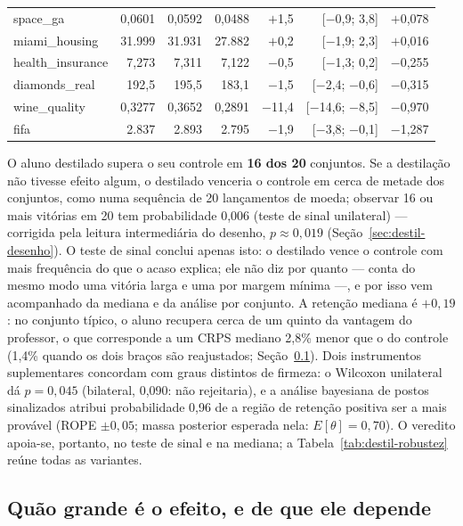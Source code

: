 \begin{table}[htbp]
\begin{tabular}{lrrrrrr}
space\_ga & 0,0601 & 0,0592 & 0,0488 & $+$1,5 & [$-$0,9; 3,8] & $+$0,078 \\
miami\_housing & 31.999 & 31.931 & 27.882 & $+$0,2 & [$-$1,9; 2,3] & $+$0,016 \\
health\_insurance & 7,273 & 7,311 & 7,122 & $-$0,5 & [$-$1,3; 0,2] & $-$0,255 \\
diamonds\_real & 192,5 & 195,5 & 183,1 & $-$1,5 & [$-$2,4; $-$0,6] & $-$0,315 \\
wine\_quality & 0,3277 & 0,3652 & 0,2891 & $-$11,4 & [$-$14,6; $-$8,5] & $-$0,970 \\
fifa & 2.837 & 2.893 & 2.795 & $-$1,9 & [$-$3,8; $-$0,1] & $-$1,287 \\
\bottomrule
\end{tabular}
\end{table}

O aluno destilado supera o seu controle em \textbf{16 dos 20}
conjuntos. Se a destilação não tivesse efeito algum, o destilado
venceria o controle em cerca de metade dos conjuntos, como numa
sequência de 20 lançamentos de moeda; observar 16 ou mais vitórias em
20 tem probabilidade 0,006 (teste de sinal unilateral) --- corrigida
pela leitura intermediária do desenho, $p \approx 0{,}019$
(Seção~\ref{sec:destil-desenho}). O teste de sinal conclui apenas
isto: o destilado vence o controle com mais frequência do que o acaso
explica; ele não diz por quanto --- conta do mesmo modo uma vitória
larga e uma por margem mínima ---, e por isso vem acompanhado da
mediana e da análise por conjunto. A retenção mediana é $+0{,}19$: no
conjunto típico, o aluno recupera cerca de um quinto da vantagem do
professor, o que corresponde a um CRPS mediano 2,8\% menor que o do
controle (1,4\% quando os dois braços são reajustados;
Seção~\ref{sec:destil-retune}). Dois instrumentos suplementares concordam com graus
distintos de firmeza: o Wilcoxon unilateral dá $p=0{,}045$ (bilateral,
0,090: não rejeitaria), e a análise bayesiana de postos sinalizados
\citep{benavoli2017} atribui probabilidade 0,96 de a região de
retenção positiva ser a mais provável (ROPE $\pm0{,}05$; massa
posterior esperada nela: $E[\theta]=0{,}70$).
O veredito apoia-se, portanto, no teste de sinal e na mediana; a
Tabela~\ref{tab:destil-robustez} reúne todas as variantes.

\subsection{Quão grande é o efeito, e de que ele depende}
\label{sec:destil-retune}

